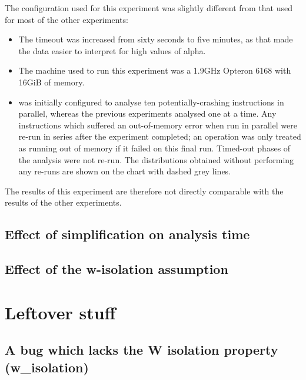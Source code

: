 The configuration used for this experiment was slightly different from
that used for most of the other experiments:
\begin{itemize}
\item The timeout was increased from sixty seconds to five minutes, as
  that made the data easier to interpret for high values of
  \gls{alpha}.
\item The machine used to run this experiment was a 1.9GHz Opteron
  6168 with 16GiB of memory.
\item {\Implementation} was initially configured to analyse ten
  potentially-crashing instructions in parallel, whereas the previous
  experiments analysed one at a time.  Any instructions which suffered
  an out-of-memory error when run in parallel were re-run in series
  after the experiment completed; an operation was only treated as
  running out of memory if it failed on this final run.  Timed-out
  phases of the analysis were not re-run.  The distributions obtained
  without performing any re-runs are shown on the chart with dashed
  grey lines.
\end{itemize}
The results of this experiment are therefore not directly comparable
with the results of the other experiments.

\subsection{Effect of {\StateMachine} simplification on analysis time}


\subsection{Effect of the \gls{w-isolation} assumption}

\section{Leftover stuff}

\subsection{A bug which lacks the W isolation property (w\_isolation)}


